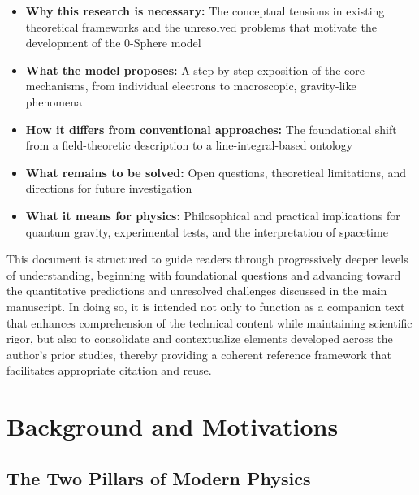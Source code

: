 \documentclass[12pt,letterpaper]{article}
\begin{document}
\begin{itemize}
\item \textbf{Why this research is necessary:} The conceptual tensions in existing theoretical frameworks and the unresolved problems that motivate the development of the 0-Sphere model
\item \textbf{What the model proposes:} A step-by-step exposition of the core mechanisms, from individual electrons to macroscopic, gravity-like phenomena
\item \textbf{How it differs from conventional approaches:} The foundational shift from a field-theoretic description to a line-integral-based ontology
\item \textbf{What remains to be solved:} Open questions, theoretical limitations, and directions for future investigation
\item \textbf{What it means for physics:} Philosophical and practical implications for quantum gravity, experimental tests, and the interpretation of spacetime
\end{itemize}

This document is structured to guide readers through progressively deeper levels of understanding, beginning with foundational questions and advancing toward the quantitative predictions and unresolved challenges discussed in the main manuscript. In doing so, it is intended not only to function as a companion text that enhances comprehension of the technical content while maintaining scientific rigor, but also to consolidate and contextualize elements developed across the author's prior studies, thereby providing a coherent reference framework that facilitates appropriate citation and reuse.


\section{Background and Motivations}
\label{sec:background}

\justifying


\subsection{The Two Pillars of Modern Physics}
\label{subsec:two_pillars}
\end{document}
